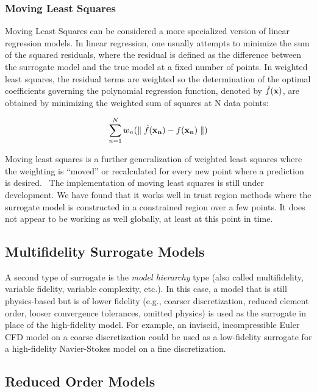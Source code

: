 \subsubsection{Moving Least Squares}\label{models:surf:mls}

Moving Least Squares can be considered a more specialized 
version of linear regression models.  In linear regression, 
one usually attempts to minimize the sum of the squared residuals, 
where the residual is defined as the difference between the 
surrogate model and the true model at a fixed number of points. 
In weighted least squares, the residual terms are weighted so the 
determination of the optimal coefficients governing the polynomial 
regression function, denoted by $\hat{f}({\bf x})$, are obtained by 
minimizing the weighted sum of squares at N data points: 

\begin{equation}
  \sum_{n=1}^{N}w_{n}({\parallel \hat{f}({\bf x_{n}})-f({\bf x_{n}})\parallel})
  \label{models:surf:equation12}  
\end{equation}

Moving least squares is a further generalization of weighted least squares
where the weighting is ``moved'' or recalculated for every new point where 
a prediction is desired.~\cite{Nea04}  The implementation of 
moving least squares 
is still under development.  We have found that it works well 
in trust region methods where the surrogate model is constructed in 
a constrained region over a few points.  It does not appear to be working 
as well globally, at least at this point in time.

\subsection{Multifidelity Surrogate Models} \label{models:surrogate:multifid}

A second type of surrogate is the {\em model hierarchy} type (also
called multifidelity, variable fidelity, variable complexity, etc.).
In this case, a model that is still physics-based but is of lower
fidelity (e.g., coarser discretization, reduced element order, looser
convergence tolerances, omitted physics) is used as the surrogate in
place of the high-fidelity model.  For example, an inviscid,
incompressible Euler CFD model on a coarse discretization could be
used as a low-fidelity surrogate for a high-fidelity Navier-Stokes
model on a fine discretization.

\subsection{Reduced Order Models} \label{models:surrogate:rom}

